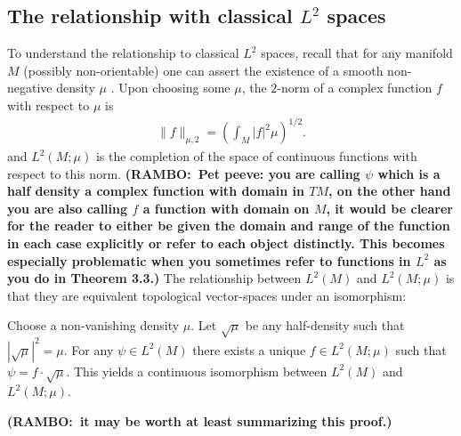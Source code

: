 \documentclass[final,leqno]{siamltex1213}
\newcommand{\ram}[1]{{\normalsize{\textbf{({\color{red}RAMBO:\ }#1)}}}}
\DeclareMathOperator{\Dens}{Dens}
\begin{document}
\subsection{The relationship with classical $L^{2}$ spaces}
\label{sec:classical_Lebesgue}
To understand the relationship to classical $L^2$ spaces, recall that for any manifold $M$ (possibly non-orientable) one can assert the existence of a smooth non-negative density $\mu$ \cite[Chapter 16]{Lee2006}.
Upon choosing some $\mu$, the $2$-norm of a complex function $f$ with respect to $\mu$ is
\begin{align}
	\| f \|_{\mu,2} =  \left( \int_M |f|^2 \mu \right)^{1/2}.
\end{align}
and $L^2(M ; \mu)$ is the completion of the space of continuous functions with respect to this norm. \ram{Pet peeve: you are calling $\psi$ which is a half density a complex function with domain in $TM$, on the other hand you are also calling $f$ a function with domain on $M$, it would be clearer for the reader to either be given the domain and range of the function in each case explicitly or refer to each object distinctly. This becomes especially problematic when you sometimes refer to functions in $L^2$ as you do in Theorem 3.3.}
The relationship between $L^{2}(M)$ and $L^{2}(M;\mu)$ is that they are equivalent topological vector-spaces under an isomorphism:
\begin{proposition}
	Choose a non-vanishing density $\mu$.
	Let $\sqrt{\mu}$ be any half-density such that $| \sqrt{\mu} |^{2} = \mu$.
	For any $\psi \in L^2(M)$ there exists a unique $f \in L^2(M ; \mu)$ such that $\psi = f \cdot  \sqrt{\mu}$.
	This yields a continuous isomorphism between $L^2(M)$ and $L^2(M ; \mu)$.
\end{proposition}
\ram{it may be worth at least summarizing this proof.}
%	
\end{document}
